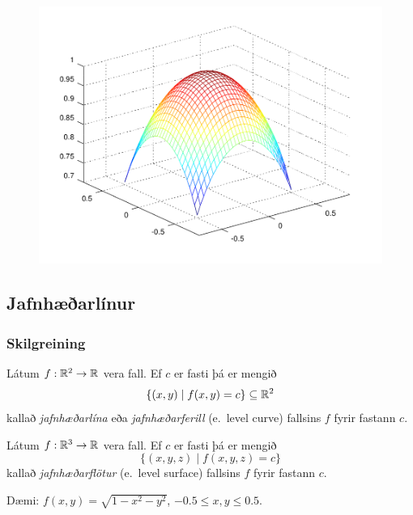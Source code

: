 \begin{figure}[h]
\begin{center}
\includegraphics{surface.png}
\caption*{ } 
\end{center}
\end{figure}  



\subsection{Jafnhæðarlínur}
 \subsubsection {Skilgreining }
  Látum $f:{\mathbb R}^2\rightarrow {\mathbb R}$ vera fall.  Ef $c$ er fasti þá er mengið 
$$\{(x,y)\mid f(x,y)=c\}\subseteq {\mathbb R}^2$$
kallað {\em jafnhæðarlína} eða {\em jafnhæðarferill} (e.~level curve) fallsins $f$ fyrir fastann $c$.

 Látum $f:{\mathbb R}^3\rightarrow {\mathbb R}$ vera fall.  Ef $c$ er fasti þá er mengið 
$$\{(x,y,z)\mid f(x,y,z)=c\}$$
kallað {\em jafnhæðarflötur} (e.~level surface)  
fallsins $f$ fyrir fastann $c$.
 


 Dæmi: $f(x,y) = \sqrt{1-x^2-y^2}$, $-0.5\leq x,y\leq 0.5$.         

